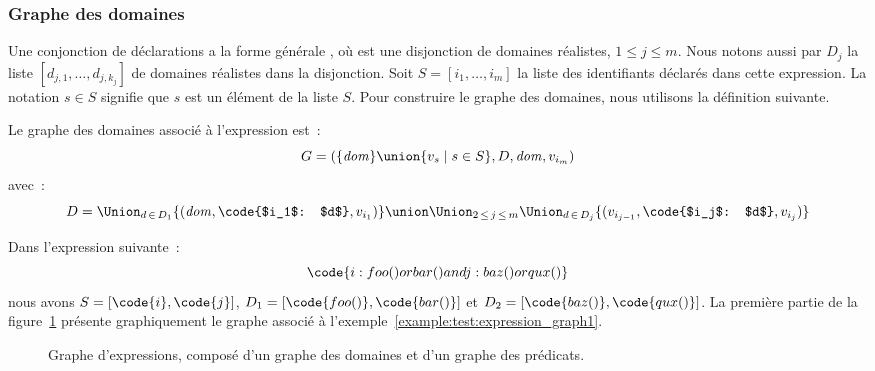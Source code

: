 \subsubsection{Graphe des domaines}

Une conjonction de déclarations a la forme générale , où 
est une disjonction de domaines réalistes, $1 \leq j \leq m$. Nous notons aussi
par $D_j$ la liste $[d_{j,1}, \dots, d_{j,k_j}]$ de domaines réalistes dans la
disjonction. Soit $S = [i_1, \dots, i_m]$ la liste des identifiants déclarés
dans cette expression. La notation $s \in S$ signifie que $s$ est un élément de
la liste $S$. Pour construire le graphe des domaines, nous utilisons la
définition suivante.

\begin{definition}

Le {\strong graphe des domaines} associé à l'expression  est~:
%
$$G = (\{\mathit{dom}\} \union \{v_s \;\vert\; s \in S\}, D, \mathit{dom}, v_{i_m})$$
%
avec~:
%
$$D = \Union_{d \,\in\, D_1} \{(\mathit{dom}, \code{$i_1$: $d$}, v_{i_1})\} \union
      \Union_{2 \,\leq\, j \,\leq\, m}
      \Union_{d \,\in\, D_j} \{(v_{i_{j - 1}}, \code{$i_j$: $d$}, v_{i_{j}})\}$$

\end{definition}

\begin{example}
\label{example:test:expression_graph1}

Dans l'expression suivante~:
%
$$\code{i: foo() or bar() and j: baz() or qux()}$$
%
nous avons $S = [\code{i}, \code{j}]$, $D_1 = [\code{foo()}, \code{bar()}]$ et
$D_2 = [\code{baz()}, \code{qux()}]$. La première partie de la
figure~\ref{figure:test:expression_graph} présente graphiquement le graphe
associé à l'exemple~\ref{example:test:expression_graph1}.

\end{example}

\begin{figure}


\caption{\label{figure:test:expression_graph} Graphe d'expressions, composé
d'un graphe des domaines et d'un graphe des prédicats.}

\end{figure}

